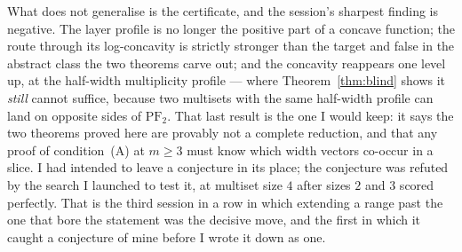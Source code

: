 \documentclass[11pt]{article}
\theoremstyle{definition}
\newcommand{\PFtwo}{\mathrm{PF}_2}
\begin{document}
What does not generalise is the certificate, and the session's sharpest finding is
negative. The layer profile is no longer the positive part of a concave function; the route
through its log-concavity is strictly stronger than the target and false in the abstract
class the two theorems carve out; and the concavity reappears one level up, at the
half-width multiplicity profile --- where Theorem~\ref{thm:blind} shows it \emph{still}
cannot suffice, because two multisets with the same half-width profile can land on opposite
sides of $\PFtwo$. That last result is the one I would keep: it says the two theorems proved
here are provably not a complete reduction, and that any proof of condition~(A) at $m\ge3$
must know which width vectors co-occur in a slice. I had intended to leave a conjecture in
its place; the conjecture was refuted by the search I launched to test it, at multiset size
$4$ after sizes $2$ and $3$ scored perfectly. That is the third session in a row in which
extending a range past the one that bore the statement was the decisive move, and the first
in which it caught a conjecture of mine before I wrote it down as one.
\end{document}
